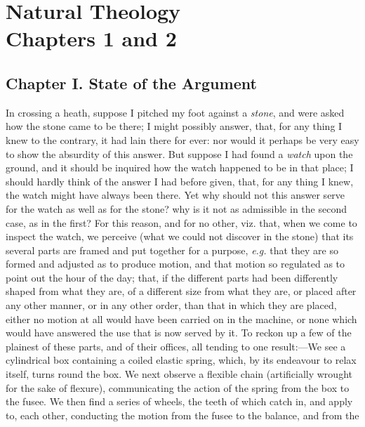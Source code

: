 
\author{William Paley}
\chapter[William Paley -- Natural Theology, chaps. 1 and 2]{Natural
Theology\\\smaller Chapters 1 and 2}


\section*{Chapter I. State of the Argument}

In crossing a heath, suppose I pitched my foot against a
\textit{stone}, and were asked how the stone came to be there; I might
possibly answer, that, for any thing I knew to the contrary, it had
lain there for ever: nor would it perhaps be very easy to show the
absurdity of this answer. But suppose I had found a \textit{watch}
upon the ground, and it should be inquired how the watch happened to
be in that place; I should hardly think of the answer I had before
given, that, for any thing I knew, the watch might have always been
there. Yet why should not this answer serve for the watch as well as
for the stone? why is it not as admissible in the second case, as in
the first? For this reason,  and for no other, viz. that, when
we come to inspect the watch, we perceive (what we could not discover
in the stone) that its several parts are framed and put together for a
purpose, \textit{e.g.} that they are so formed and adjusted as to
produce motion, and that motion so regulated as to point out the hour
of the day; that, if the different parts had been differently shaped
from what they are, of a different size from what they are, or placed
after any other manner, or in any other order, than that in which they
are placed, either no motion at all would have been carried on in the
machine, or none which would have answered the use that is now served
by it. To reckon up a few of the plainest of these parts, and of their
offices, all tending to one re\-sult:---We see a cylindrical box
containing a coiled elastic spring, which, by its endeavour to relax
itself, turns round the box. We next observe a flexible chain
(artificially wrought for the sake of flexure), communicating the
action of the spring from the box to the fusee. We then find a series
of wheels, the teeth of which catch in, and apply to, each other,
conducting the motion from the fusee to the balance, and from the
